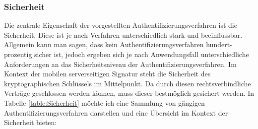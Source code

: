 \documentclass[11pt,a4paper,ngerman]{scrreprt}
\begin{document}
\subsubsection{Sicherheit}
Die zentrale Eigenschaft der vorgestellten Authentifizierungsverfahren ist die Sicherheit. Diese ist je nach Verfahren unterschiedlich stark und beeinflussbar. Allgemein kann man sagen, dass kein Authentifizierungsverfahren hundert-prozentig sicher ist, jedoch ergeben sich je nach Anwendungsfall unterschiedliche Anforderungen an das Sicherheitsniveau der Authentifizierungsverfahren. Im Kontext der mobilen serverseitigen Signatur steht die Sicherheit des kryptographischen Schlüssels im Mittelpunkt. Da durch diesen rechtsverbindliche Verträge geschlossen werden können, muss dieser bestmöglich gesichert werden. In Tabelle \ref{table:Sicherheit} möchte ich eine Sammlung von gängigen Authentifizierungsverfahren \cite{fido17} darstellen und eine Übersicht im Kontext der Sicherheit bieten:
\end{document}
